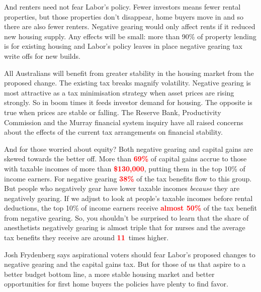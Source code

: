 \documentclass[b5paper,11pt]{article}\usepackage[]{graphicx}\usepackage[]{color}
\begin{document}
And renters need not fear Labor's policy. Fewer investors means fewer
rental properties, but those properties don't disappear, home buyers
move in and so there are also fewer renters. Negative gearing would only
affect rents if it reduced new housing supply. Any effects will be
small: more than 90\% of property lending is for existing housing
and Labor's policy leaves in place negative gearing tax write offs for
new builds.

All Australians will benefit from greater stability in the housing
market from the proposed change. The existing tax breaks magnify
volatility. Negative gearing is most attractive as a tax minimisation
strategy when asset prices are rising strongly. So in boom times it
feeds investor demand for housing. The opposite is true when prices are
stable or falling. The Reserve Bank, Productivity Commission and the
Murray financial system inquiry have all raised concerns about the
effects of the current tax arrangements on financial stability.

And for those worried about equity? Both negative gearing and capital
gains are skewed towards the better off. More than \textcolor{red}{\textbf{69\%}} of
capital gains accrue to those with taxable incomes of more than \textcolor{red}{\textbf{\$130,000}},
putting them in the top 10\% of income earners. For negative
gearing \textcolor{red}{\textbf{38\%}} of the tax benefits flow to this group. But people
who negatively gear have lower taxable incomes \emph{because} they are
negatively gearing. If we adjust to look at people's taxable incomes
before rental deductions, the top 10\% of income earners receive
\textcolor{red}{\textbf{almost 50\%}} of the tax benefit from negative gearing. So, you
shouldn't be surprised to learn that the share of anesthetists negatively gearing is almost
triple that for nurses and the average tax benefits they receive are around
\textcolor{red}{\textbf{11}}~times higher.

Josh Frydenberg says aspirational voters should fear Labor's proposed
changes to negative gearing and the capital gains tax. But for those of
us that aspire to a better budget bottom line, a more stable housing
market and better opportunities for first home buyers the policies have
plenty to find favor.
\end{document}
